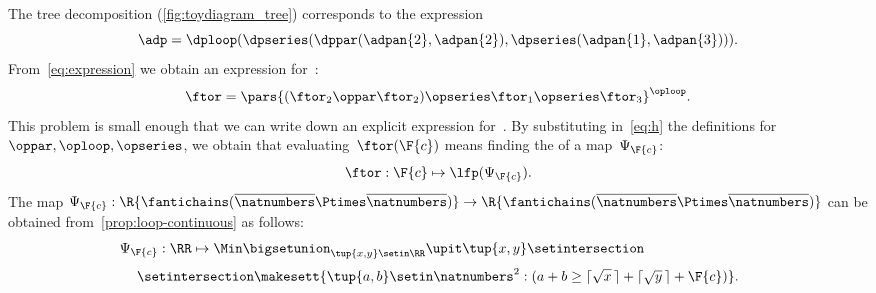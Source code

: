 \begin{marginfigure}
    \caption{}
    \label{fig:toydiagram_tree}
\end{marginfigure}

The tree decomposition (\cref{fig:toydiagram_tree}) corresponds to the expression
%
\begin{equation}
    \adp=\dploop(\dpseries(\dppar(\adpan{2},\adpan{2}),\dpseries(\adpan{1},\adpan{3}))).
    \label{eq:expression}
\end{equation}
%
From~\cref{eq:expression} we obtain an expression for~\ftor:
%
\begin{equation}
    \ftor=\pars{(\ftor_{2}\oppar\ftor_{2})\opseries\ftor_{1}\opseries\ftor_{3}}^{\oploop}.
    \label{eq:h}
\end{equation}
%
This problem is small enough that we can write down an explicit expression for~\ftor.
By substituting in~\cref{eq:h} the definitions for $\oppar, \oploop, \opseries$, we obtain that evaluating~$\ftor(\F{c})$ means finding the  of a map~$\Psi_{\F{c}}$:
%
\begin{equation}
    \ftor:\F{c}\mapsto\lfp(\Psi_{\F{c}}).
\end{equation}
%
The map $\Psi_{\F{c}}:\R{\fantichains(\overline{\natnumbers}\Ptimes\overline{\natnumbers})}\rightarrow\R{\fantichains(\overline{\natnumbers}\Ptimes\overline{\natnumbers})}$ can be obtained from~\cref{prop:loop-continuous} as follows:
%
\begin{equation}
    \Psi_{\F{c}}:\RR\mapsto\Min\bigsetunion_{\tup{ x,y} \setin\RR}\upit\tup{ x,y} \setintersection\qquad\qquad\qquad\qquad
\end{equation}
%
\begin{equation}
    \setintersection \makesett{
        \tup{ a,b} \setin\natnumbers^{2}:
        (
        a+b\geq\lceil\sqrt{x}\,\rceil+\lceil\sqrt{y}\,\rceil+\F{c}
        )
    }.
\end{equation}
%

